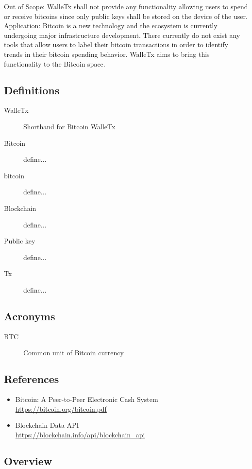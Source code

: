 	Out of Scope: WalleTx shall not provide any functionality allowing users to spend or receive bitcoins since only public keys shall be stored on the device of the user.\\
	
	Application: Bitcoin is a new technology and the ecosystem is currently undergoing major infrastructure development. There currently do not exist any tools that allow users to label their bitcoin transactions in order to identify trends in their bitcoin spending behavior. WalleTx aims to bring this functionality to the Bitcoin space.\\
    
	\subsection{Definitions}

	\begin{description}
		\item[WalleTx] Shorthand for Bitcoin WalleTx
		\item[Bitcoin] define...
		\item[bitcoin] define...
		\item[Blockchain] define...
		\item[Public key] define...
		\item[Tx] define...
	\end{description}

	\subsection{Acronyms}

	\begin{description}
		\item[BTC] Common unit of Bitcoin currency
	\end{description}

	\subsection{References}

	\begin{itemize}
		\item Bitcoin: A Peer-to-Peer Electronic Cash System\\ \url{https://bitcoin.org/bitcoin.pdf}
		\item Blockchain Data API\\ \url{https://blockchain.info/api/blockchain_api}
	\end{itemize}

	\subsection{Overview}
